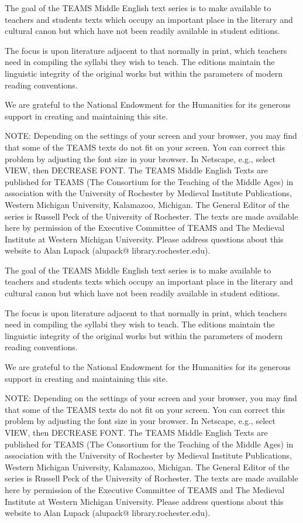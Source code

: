 The goal of the TEAMS Middle English text series is to make available to teachers and students texts which occupy an important place in the literary and cultural canon but which have not been readily available in student editions.

The focus is upon literature adjacent to that normally in print, which teachers need in compiling the syllabi they wish to teach. The editions maintain the linguistic integrity of the original works but within the parameters of modern reading conventions.

We are grateful to the National Endowment for the Humanities for its generous support in creating and maintaining this site.

NOTE: Depending on the settings of your screen and your browser, you may find that some of the TEAMS texts do not fit on your screen. You can correct this problem by adjusting the font size in your browser. In Netscape, e.g., select VIEW, then DECREASE FONT.
The TEAMS Middle English Texts are published for TEAMS (The Consortium for the Teaching of the Middle Ages) in association with the University of Rochester by Medieval Institute Publications, Western Michigan University, Kalamazoo, Michigan. The General Editor of the series is Russell Peck of the University of Rochester. The texts are made available here by permission of the Executive Committee of TEAMS and The Medieval Institute at Western Michigan University. Please address questions about this website to Alan Lupack (alupack@ library.rochester.edu).

The goal of the TEAMS Middle English text series is to make available to teachers and students texts which occupy an important place in the literary and cultural canon but which have not been readily available in student editions.

The focus is upon literature adjacent to that normally in print, which teachers need in compiling the syllabi they wish to teach. The editions maintain the linguistic integrity of the original works but within the parameters of modern reading conventions.

We are grateful to the National Endowment for the Humanities for its generous support in creating and maintaining this site.

NOTE: Depending on the settings of your screen and your browser, you may find that some of the TEAMS texts do not fit on your screen. You can correct this problem by adjusting the font size in your browser. In Netscape, e.g., select VIEW, then DECREASE FONT.
The TEAMS Middle English Texts are published for TEAMS (The Consortium for the Teaching of the Middle Ages) in association with the University of Rochester by Medieval Institute Publications, Western Michigan University, Kalamazoo, Michigan. The General Editor of the series is Russell Peck of the University of Rochester. The texts are made available here by permission of the Executive Committee of TEAMS and The Medieval Institute at Western Michigan University. Please address questions about this website to Alan Lupack (alupack@ library.rochester.edu).

